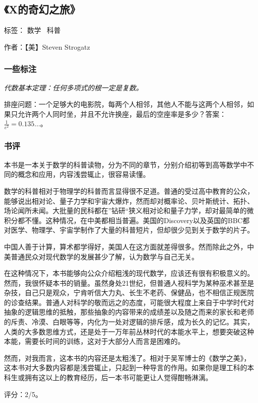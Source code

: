 \subsection{《X的奇幻之旅》}

标签： 数学 \  科普

作者：【美】Steven Strogatz

\subsubsection{一些标注}

\begin{itemize*}
 \item \emph{代数基本定理：任何多项式的根一定是复数。}
 \item 排座问题：一个足够大的电影院，每两个人相邻，其他人不能与这两个人相邻，如果只允许两个人同时坐，并且不允许换座，最后的空座率是多少？答案：$\frac{1}{e^2} = 0.135\ldots$。
\end{itemize*}

\subsubsection{书评}
本书是一本关于数学的科普读物，分为不同的章节，分别介绍初等到高等数学中不同的概念和应用，内容浅尝辄止，很容易读懂。

数学的科普相对于物理学的科普而言显得很不足道。普通的受过高中教育的公众，能够说出相对论、量子力学和宇宙大爆炸，然而却对概率论、贝叶斯统计、拓扑、场论闻所未闻。大批量的民科都在”钻研“狭义相对论和量子力学，却对最简单的微积分都不懂。这种情况，在中美都相当普遍。美国的Discovery以及英国的BBC都对医学、物理学、宇宙学制作了大量的科普短片，但却很少见到关于数学的片子。

中国人善于计算，算术都学得好，美国人在这方面就差得很多。然而除此之外，中美普通民众对现代数学的发展甚少了解，认为数学与自己无关。

在这种情况下，本书能够向公众介绍粗浅的现代数学，应该还有很有积极意义的。然而，我很怀疑本书的销量。虽然身处21世纪，但普通人视科学为某种巫术甚至是杂技，自己只是观众，宁肯听信大力丸、长生不老药、保健品，也不相信正规医院的诊查结果。普通人对科学的敬而远之的态度，可能很大程度上来自于中学时代对抽象的逻辑思维的抵触，那些抽象的内容带来的成绩差以及随之而来的家长和老师的斥责、冷漠、白眼等等，内化为一处对逻辑的排斥感，成为长久的记忆。其实，人类的大多数思维方式，还是处于一万年前丛林时代的本能水平上，想要突破这种本能，需要长时间的训练，这对于大部分人而言是困难的。

然而，对我而言，这本书的内容还是太粗浅了。相对于吴军博士的《数学之美》，这本书对大多数内容都是浅尝辄止，只起到一种导言的作用。如果你是理工科的本科生或拥有这以上的教育经历，后一本书可能更让人觉得酣畅淋漓。

评分：2/5。
